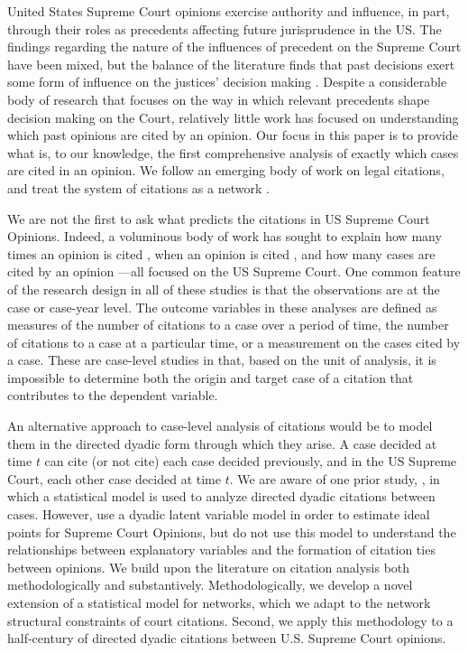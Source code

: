 \documentclass[headsepline=true, abstracton]{scrartcl}
\begin{document}
 
United States Supreme Court opinions exercise authority and influence, in part, through their roles as precedents affecting future jurisprudence in the US. The findings regarding the nature of the influences of precedent on the Supreme Court have been mixed, but the balance of the literature finds that past decisions exert some form of influence on the justices' decision making \citep{knight1996norm,gillman2001s,richards2002jurisprudential,hansford2006politics,bailey2008does,bailey2011constrained,hitt2016measuring}. Despite a considerable body of research that focuses on the way in which relevant precedents shape decision making on the Court, relatively little work has focused on understanding which past opinions are cited by an opinion. Our focus in this paper is to provide what is, to our knowledge, the first comprehensive analysis of exactly which cases are cited in an opinion. We follow an emerging body of work on legal citations, and treat the system of citations as a network \citep[e.g., ][]{harris1982structural,caldeira1988legal,fowler2007network, fowler2008authority,bommarito2009law,lupu2012precedent,pelc2014politics,ethayarajh2018rose}. 

We are not the first to ask what predicts the citations in US Supreme Court Opinions. Indeed, a voluminous body of work has sought to explain how many times an opinion is cited \citep[e.g.,][]{cross2010determinants,benjamin2012standing,fix2019effect}, when an opinion is cited \citep[e.g.,][]{black2013citation,spriggs2001explaining}, and how many cases are cited by an opinion \citep[e.g.,][]{lupu2013strategic}---all focused on the US Supreme Court. One common feature of the research design in all of these studies is that the observations are at the case or case-year level. The outcome variables in these analyses are defined as measures of the number of citations to a case over a period of time, the number of citations to a case at a particular time, or a measurement on the cases cited by a case. These are case-level studies in that, based on the unit of analysis, it is impossible to determine both the origin and target case of a citation that contributes to the dependent variable.

An alternative approach to case-level analysis of citations would be to model them in the directed dyadic form through which they arise. A case decided at time $t$ can cite (or not cite) each case decided previously, and in the US Supreme Court, each other case decided at time $t$. We are aware of one prior study, \citet{clark2010locating}, in which a statistical model is used to analyze directed dyadic citations between cases. However, \citet{clark2010locating} use a dyadic latent variable model in order to estimate ideal points for Supreme Court Opinions, but do not use this model to understand the relationships between explanatory variables and the formation of citation ties between opinions. We build upon the literature on citation analysis both methodologically and substantively. Methodologically, we develop a novel extension of a statistical model for networks, which we adapt to the network structural constraints of court citations. Second, we apply this methodology to a half-century of directed dyadic citations between U.S. Supreme Court opinions.
\end{document}
